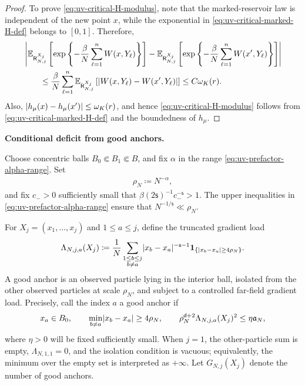 \documentclass[11pt,reqno]{amsart}
\numberwithin{equation}{section}
\theoremstyle{plain}
\theoremstyle{remark}
\DeclarePairedDelimiter{\abs}{\lvert}{\rvert}
\renewcommand{\d}{\mathsf{d}}
\newcommand{\E}{{\mathbb{E}}}
\newcommand{\be}{\beta}
\newcommand{\s}{\mathsf{s}}
\newcommand{\one}{\mathbf 1}
\newcommand{\parheading}[1]{\par\medskip\noindent\textbf{#1}\ }
\begin{document}
\begin{proof}
To prove \eqref{eq:uv-critical-H-modulus}, note that the marked-reservoir law is independent of the new point \(x\), while the exponential in \eqref{eq:uv-critical-marked-H-def} belongs to \([0,1]\).  Therefore,
\begin{align}
 &\left|
 \E_{\mathsf R_{N,j}^{X_j}}\left[
 \exp\left\{-\frac\be N\sum_{\ell=1}^nW(x,Y_\ell)\right\}\right]
 -\E_{\mathsf R_{N,j}^{X_j}}\left[
 \exp\left\{-\frac\be N\sum_{\ell=1}^nW(x',Y_\ell)\right\}\right]
 \right|\notag\\
 &\qquad\le\frac\be N\sum_{\ell=1}^n
 \E_{\mathsf R_{N,j}^{X_j}}\left[
 \abs{W(x,Y_\ell)-W(x',Y_\ell)}
 \right]
 \le C\omega_K(r).
 \label{eq:uv-critical-reservoir-expectation-modulus}
\end{align}
Also, \(\abs{h_\mu(x)-h_\mu(x')}\le\omega_K(r)\), and hence \eqref{eq:uv-critical-H-modulus} follows from \eqref{eq:uv-critical-marked-H-def} and the boundedness of \(h_\mu\).
\end{proof}

\parheading{Conditional deficit from good anchors.}

Choose concentric balls \(B_0\Subset B_1\Subset B\), and fix \(\alpha\) in the range \eqref{eq:uv-prefactor-alpha-range}.  Set
\begin{align}\label{eq:uv-critical-rho-def}
 \rho_N\coloneqq N^{-\alpha},
\end{align}
and fix \(c_->0\) sufficiently small that \(\be(2\s)^{-1}c_-^{-\s}>1\).  The upper inequalities in \eqref{eq:uv-prefactor-alpha-range} ensure that \(N^{-1/\s}\ll\rho_N\).

For \(X_j=(x_1,\ldots,x_j)\) and \(1\le a\le j\), define the truncated gradient load
\begin{align}\label{eq:uv-critical-Lambda-def}
 \Lambda_{N,j,a}(X_j)
 \coloneqq
 \frac1N\sum_{\substack{1\le b\le j\\b\ne a}}
 \abs{x_b-x_a}^{-\s-1}
 \one_{\{\abs{x_b-x_a}\ge4\rho_N\}}.
\end{align}
A good anchor is an observed particle lying in the interior ball, isolated from the other observed particles at scale \(\rho_N\), and subject to a controlled far-field gradient load.  Precisely, call the index \(a\) a good anchor if
\begin{align}\label{eq:uv-critical-good-anchor-def}
 x_a\in B_0,
 \qquad
 \min_{b\ne a}\abs{x_b-x_a}\ge4\rho_N,
 \qquad
 \rho_N^{\d+2}\Lambda_{N,j,a}(X_j)^2
 \le\eta\mathfrak a_N,
\end{align}
where \(\eta>0\) will be fixed sufficiently small.  When \(j=1\), the other-particle sum is empty, \(\Lambda_{N,1,1}=0\), and the isolation condition is vacuous; equivalently, the minimum over the empty set is interpreted as \(+\infty\).  Let \(G_{N,j}(X_j)\) denote the number of good anchors.
\end{document}
